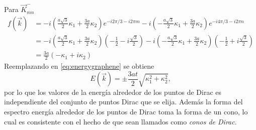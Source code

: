 Para $\vec{K}^{-}_{mn}$
\begin{align}
	\nonumber f(\vec{k}) & = -i \left(\frac{a\sqrt{3}}{2}\kappa_1+\frac{3a}{2}\kappa_2\right)e^{-i 2\pi/3-i2\pi m}-i \left(-\frac{a\sqrt{3}}{2}\kappa_1 + \frac{3a}{2}\kappa_2\right)e^{-i 4\pi/3-i2\pi n}                                                     \\
	\nonumber            & = -i \left(\frac{a\sqrt{3}}{2}\kappa_1+\frac{3a}{2}\kappa_2\right)\left(-\frac{1}{2}-i \frac{\sqrt{3}}{2} \right)-i \left(-\frac{a\sqrt{3}}{2}\kappa_1 + \frac{3a}{2}\kappa_2\right)\left(-\frac{1}{2}+i \frac{\sqrt{3}}{2} \right) \\
                       & =  \frac{3a}{2}\left(-\kappa_1+i\kappa_2\right)\label{EQ:firstApproxEnergy2}
\end{align}
Reemplazando en \eqref{eq:energygraphene} se obtiene 
\begin{equation}
   E(\vec{k}) = \pm \frac{3a t}{2} \sqrt{\kappa_1^2 + \kappa_2^2},
\end{equation}
por lo que los valores de la energía alrededor de los puntos de Dirac es independiente del conjunto de puntos Dirac que se elija. Además la forma del espectro energía alrededor de los puntos de Dirac toma la forma de un cono, lo cual es consistente con el hecho de que sean llamados como \emph{conos de Dirac}.
